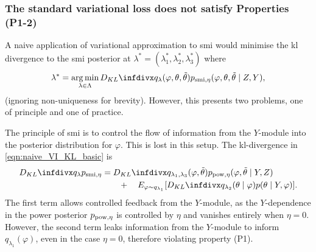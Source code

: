 
\subsubsection{The standard variational loss does not satisfy Properties (P1-2)}
A naive application of variational approximation to \acrshort*{smi} would minimise the \acrshort*{kl} divergence to the \acrshort*{smi} posterior at $\lambda^*=(\lambda^*_1,\lambda^*_2,\lambda^*_3)$ where
\begin{equation}\label{eqn:naive_VI_KL_basic}
  \lambda^* = \argmin_{\lambda\in \Lambda} \kl{ q_{\lambda}(\varphi, \theta, \tilde\theta) }{ p_{ \smi, \eta}(\varphi, \theta, \tilde\theta \mid Z, Y) },
\end{equation}
(ignoring non-uniqueness for brevity).
However, this presents two problems, one of principle and one of practice.

The principle of \acrshort*{smi} is to control the flow of information from the $Y$-module into the posterior distribution for $\varphi$.
This is lost in this setup.
The \acrshort*{kl}-divergence in \cref{eqn:naive_VI_KL_basic} is
\begin{align}\label{eqn:naive_VI_KL_expand}
  \kl{ q_{\lambda} }{ p_{ \smi, \eta}}
   & =\kl{q_{\lambda_1,\lambda_3}(\varphi,\tilde\theta) }{p_{\pow, \eta}(\varphi,\tilde\theta \mid Y,Z)}\nonumber
  \\
   & \qquad+\quad E_{\varphi\sim q_{\lambda_1}}[\kl{q_{\lambda_2}(\theta\mid \varphi)}{p(\theta \mid Y,\varphi)}].
\end{align}
The first term allows controlled feedback from the $Y$-module, as the $Y$-dependence in the power posterior $p_{\operatorname{\text{pow}}, \eta}$ is controlled by $\eta$ and vanishes entirely when $\eta=0$.
However, the second term leaks information from the $Y$-module to inform $q_{\lambda_1}(\varphi)$, even in the case $\eta=0$, therefore violating property (P1).


